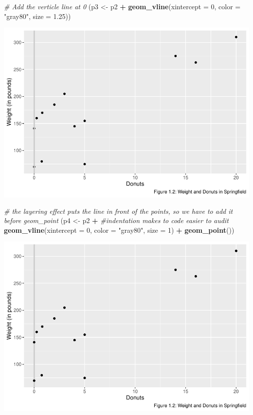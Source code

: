 \documentclass[]{book}
\newenvironment{Shaded}{\begin{snugshade}}{\end{snugshade}}
\newcommand{\CommentTok}[1]{\textcolor[rgb]{0.56,0.35,0.01}{\textit{#1}}}
\newcommand{\DataTypeTok}[1]{\textcolor[rgb]{0.13,0.29,0.53}{#1}}
\newcommand{\DecValTok}[1]{\textcolor[rgb]{0.00,0.00,0.81}{#1}}
\newcommand{\FloatTok}[1]{\textcolor[rgb]{0.00,0.00,0.81}{#1}}
\newcommand{\KeywordTok}[1]{\textcolor[rgb]{0.13,0.29,0.53}{\textbf{#1}}}
\newcommand{\NormalTok}[1]{#1}
\newcommand{\OperatorTok}[1]{\textcolor[rgb]{0.81,0.36,0.00}{\textbf{#1}}}
\newcommand{\StringTok}[1]{\textcolor[rgb]{0.31,0.60,0.02}{#1}}
\begin{document}
\begin{Shaded}
\begin{Highlighting}[]
\CommentTok{# Add the verticle line at 0}
\NormalTok{(p3 <-}\StringTok{ }\NormalTok{p2 }\OperatorTok{+}\StringTok{ }\KeywordTok{geom_vline}\NormalTok{(}\DataTypeTok{xintercept =} \DecValTok{0}\NormalTok{, }\DataTypeTok{color =} \StringTok{"gray80"}\NormalTok{, }\DataTypeTok{size =} \FloatTok{1.25}\NormalTok{))}
\end{Highlighting}
\end{Shaded}

\includegraphics{bailey_files/figure-latex/unnamed-chunk-3-2.pdf}

\begin{Shaded}
\begin{Highlighting}[]
\CommentTok{# the layering effect puts the line in front of the points, so we have to add it before geom_point}
\NormalTok{(p4 <-}\StringTok{ }\NormalTok{p2 }\OperatorTok{+}\StringTok{ }\CommentTok{#indentation makes to code easier to audit}
\StringTok{    }\KeywordTok{geom_vline}\NormalTok{(}\DataTypeTok{xintercept =} \DecValTok{0}\NormalTok{, }\DataTypeTok{color =} \StringTok{"gray80"}\NormalTok{, }\DataTypeTok{size =} \DecValTok{1}\NormalTok{) }\OperatorTok{+}
\StringTok{    }\KeywordTok{geom_point}\NormalTok{())}
\end{Highlighting}
\end{Shaded}

\includegraphics{bailey_files/figure-latex/unnamed-chunk-3-3.pdf}
\end{document}
